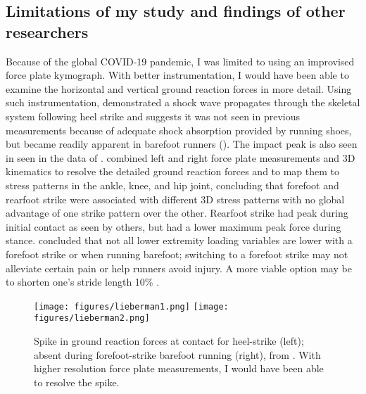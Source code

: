 \subsection{Limitations of my study and findings of other researchers}
Because of the global COVID-19 pandemic, I was limited to using an improvised force plate kymograph.  With better instrumentation, I would have been able to examine the horizontal and vertical ground reaction forces in more detail. Using such instrumentation, \citet{dickinson1985measurement} demonstrated a shock wave propagates through the skeletal system following heel strike and suggests it was not seen in previous measurements because of adequate shock absorption provided by running shoes, but became readily apparent in barefoot runners (). The impact peak is also seen in seen in the data of \citep{chan1994foot, boyer2015rearfoot, lieberman2010foot}. \citet{knorz2017three} combined left and right force plate measurements and 3D kinematics to resolve the detailed ground reaction forces and to map them to stress patterns in the ankle, knee, and hip joint, concluding that forefoot and rearfoot strike were associated with different 3D stress patterns with no global advantage of one strike pattern over the other. Rearfoot strike had peak during initial contact as seen by others, but had a lower maximum peak force during stance. \citet{boyer2015rearfoot} concluded that not all lower extremity loading variables are lower with a forefoot strike or when running barefoot; switching to a forefoot strike may not alleviate certain pain or help runners avoid injury. A more viable option may be to shorten one’s stride length 10\% \citep{boyer2015rearfoot}.
\begin{figure}
\begin{center}
\texttt{[image: figures/lieberman1.png]}
\texttt{[image: figures/lieberman2.png]}
\end{center}
\caption{Spike in ground reaction forces at contact for heel-strike (left); absent during forefoot-strike barefoot running (right), from \citep{lieberman2010foot}. With higher resolution force plate measurements, I would have been able to resolve the spike.}
\label{fig:discussion}
\end{figure}


